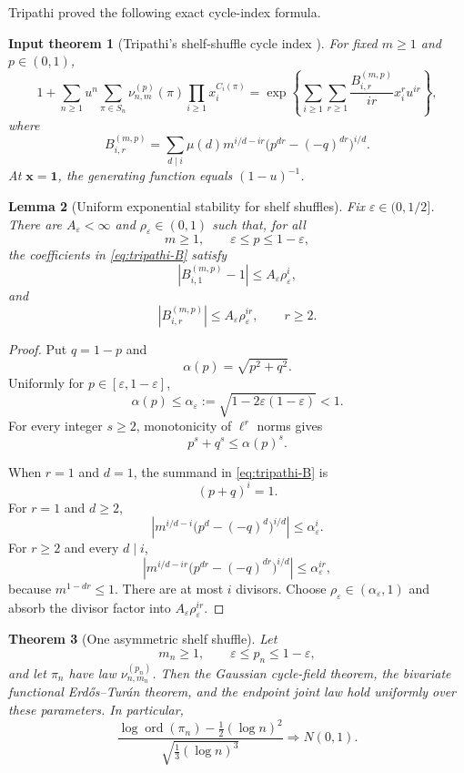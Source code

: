 \documentclass[11pt]{article}
\newtheorem{theorem}{Theorem}[section]
\newtheorem{lemma}[theorem]{Lemma}
\newtheorem{inputtheorem}[theorem]{Input theorem}
\theoremstyle{definition}
\theoremstyle{remark}
\newcommand{\ord}{\operatorname{ord}}
\newcommand{\eps}{\varepsilon}
\begin{document}
Tripathi proved the following exact cycle-index formula.

\begin{inputtheorem}[Tripathi's shelf-shuffle cycle index
\cite{Tripathi2026}]\label{input:tripathi}
For fixed $m\ge1$ and $p\in(0,1)$,
\[
 1+\sum_{n\ge1}u^n
 \sum_{\pi\in S_n}\nu_{n,m}^{(p)}(\pi)
 \prod_{i\ge1}x_i^{C_i(\pi)}
 =
 \exp\left\{
 \sum_{i\ge1}\sum_{r\ge1}
 \frac{B_{i,r}^{(m,p)}}{ir}x_i^ru^{ir}
 \right\},
\]
where
\begin{equation}\label{eq:tripathi-B}
 B_{i,r}^{(m,p)}
 =
 \sum_{d\mid i}
 \mu(d)m^{i/d-ir}
 \bigl(p^{dr}-(-q)^{dr}\bigr)^{i/d}.
\end{equation}
At $\mathbf x=\mathbf1$, the generating function equals $(1-u)^{-1}$.
\end{inputtheorem}

\begin{lemma}[Uniform exponential stability for shelf shuffles]
\label{lem:shelf-stability}
Fix $\eps\in(0,1/2]$.  There are $A_\eps<\infty$ and
$\rho_\eps\in(0,1)$ such that, for all
\[
 m\ge1,\qquad \eps\le p\le1-\eps,
\]
the coefficients in \eqref{eq:tripathi-B} satisfy
\[
 |B_{i,1}^{(m,p)}-1|\le A_\eps\rho_\eps^i,
\]
and
\[
 |B_{i,r}^{(m,p)}|\le A_\eps\rho_\eps^{ir},
 \qquad r\ge2.
\]
\end{lemma}

\begin{proof}
Put $q=1-p$ and
\[
 \alpha(p)=\sqrt{p^2+q^2}.
\]
Uniformly for $p\in[\eps,1-\eps]$,
\[
 \alpha(p)\le
 \alpha_\eps:=\sqrt{1-2\eps(1-\eps)}<1.
\]
For every integer $s\ge2$, monotonicity of $\ell^r$ norms gives
\[
 p^s+q^s\le\alpha(p)^s.
\]

When $r=1$ and $d=1$, the summand in
\eqref{eq:tripathi-B} is
\[
 (p+q)^i=1.
\]
For $r=1$ and $d\ge2$,
\[
 \left|
 m^{i/d-i}\bigl(p^d-(-q)^d\bigr)^{i/d}
 \right|
 \le\alpha_\eps^i.
\]
For $r\ge2$ and every $d\mid i$,
\[
 \left|
 m^{i/d-ir}\bigl(p^{dr}-(-q)^{dr}\bigr)^{i/d}
 \right|
 \le\alpha_\eps^{ir},
\]
because $m^{1-dr}\le1$.  There are at most $i$ divisors.  Choose
$\rho_\eps\in(\alpha_\eps,1)$ and absorb the divisor factor into
$A_\eps\rho_\eps^{ir}$.
\end{proof}

\begin{theorem}[One asymmetric shelf shuffle]
\label{thm:shelf}
Let
\[
 m_n\ge1,
 \qquad
 \eps\le p_n\le1-\eps,
\]
and let $\pi_n$ have law $\nu_{n,m_n}^{(p_n)}$.  Then the Gaussian
cycle-field theorem, the bivariate functional Erd\H{o}s--Tur\'an theorem,
and the endpoint joint law hold uniformly over these parameters.  In
particular,
\[
 \frac{\log\ord(\pi_n)-\frac12(\log n)^2}
 {\sqrt{\frac13(\log n)^3}}
 \Rightarrow N(0,1).
\]
\end{theorem}
\end{document}
